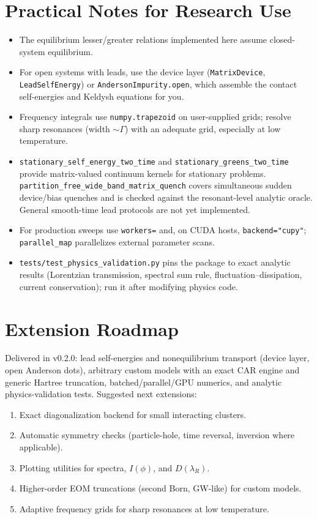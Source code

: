 \documentclass[11pt,a4paper]{article}
\begin{document}
\section{Practical Notes for Research Use}
\begin{itemize}[leftmargin=1.5em]
  \item The equilibrium lesser/greater relations implemented here assume closed-system equilibrium.
  \item For open systems with leads, use the device layer (\texttt{MatrixDevice}, \texttt{LeadSelfEnergy}) or \texttt{AndersonImpurity.open}, which assemble the contact self-energies and Keldysh equations for you.
  \item Frequency integrals use \texttt{numpy.trapezoid} on user-supplied grids; resolve sharp resonances (width $\sim\Gamma$) with an adequate grid, especially at low temperature.
  \item \texttt{stationary\_self\_energy\_two\_time} and \texttt{stationary\_greens\_two\_time} provide matrix-valued continuum kernels for stationary problems. \texttt{partition\_free\_wide\_band\_matrix\_quench} covers simultaneous sudden device/bias quenches and is checked against the resonant-level analytic oracle. General smooth-time lead protocols are not yet implemented.
  \item For production sweeps use \texttt{workers=} and, on CUDA hosts, \texttt{backend="cupy"}; \texttt{parallel\_map} parallelizes external parameter scans.
  \item \texttt{tests/test\_physics\_validation.py} pins the package to exact analytic results (Lorentzian transmission, spectral sum rule, fluctuation--dissipation, current conservation); run it after modifying physics code.
\end{itemize}

\section{Extension Roadmap}
Delivered in v0.2.0: lead self-energies and nonequilibrium transport (device layer,
open Anderson dots), arbitrary custom models with an exact CAR engine and generic
Hartree truncation, batched/parallel/GPU numerics, and analytic physics-validation
tests. Suggested next extensions:
\begin{enumerate}[leftmargin=1.5em]
  \item Exact diagonalization backend for small interacting clusters.
  \item Automatic symmetry checks (particle-hole, time reversal, inversion where applicable).
  \item Plotting utilities for spectra, \(I(\phi)\), and \(D(\lambda_R)\).
  \item Higher-order EOM truncations (second Born, GW-like) for custom models.
  \item Adaptive frequency grids for sharp resonances at low temperature.
\end{enumerate}
\end{document}
